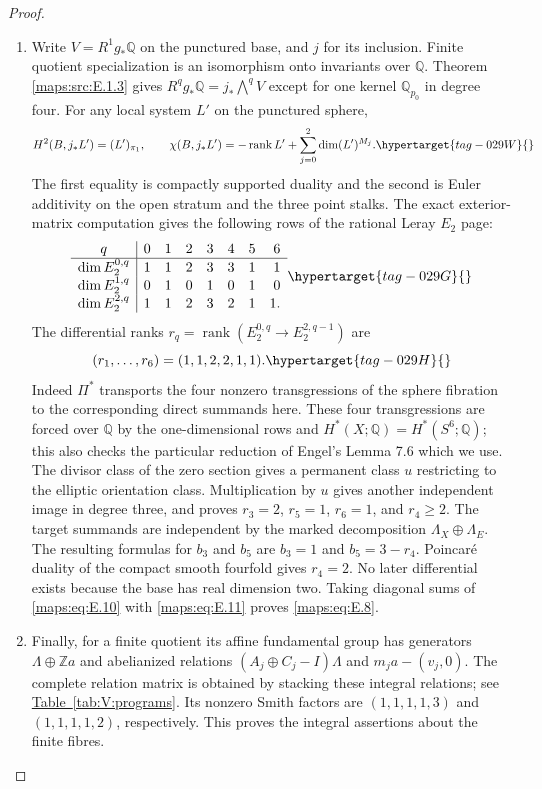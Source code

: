 \documentclass[11pt,a4paper]{article}
\numberwithin{equation}{section}
\theoremstyle{definition}
\begin{document}
\begin{proof}
\begin{enumerate}[label=\arabic*.,leftmargin=*]
\item Write $V=R^1g_*\mathbb Q$ on the punctured base, and $j$ for its
inclusion.  Finite quotient specialization is an isomorphism onto
invariants over $\mathbb Q$.  Theorem \ref{maps:src:E.1.3} gives
$R^qg_*\mathbb Q=j_*\bigwedge^qV$ except for one kernel
$\mathbb Q_{p_0}$ in degree four.  For any local system $L'$ on
the punctured sphere,
\begin{equation}
 H^2(B,j_*L')=(L')_{\pi_1},\qquad
 \chi(B,j_*L')=-\operatorname{rank}L'+
       \sum_{j=0}^2\dim (L')^{M_j}.
 \hypertarget{tag-029W}{}\label{maps:eq:E.9}
\end{equation}
The first equality is compactly supported duality and the second is
Euler additivity on the open stratum and the three point stalks.
The exact exterior-matrix computation gives the following rows of
the rational Leray $E_2$ page:
\begin{equation}
\begin{array}{c|rrrrrrr}
q&0&1&2&3&4&5&6\\ \hline
\dim E_2^{0,q}&1&1&2&3&3&1&1\\
\dim E_2^{1,q}&0&1&0&1&0&1&0\\
\dim E_2^{2,q}&1&1&2&3&2&1&1.
\end{array}
\hypertarget{tag-029G}{}\label{maps:eq:E.10}
\end{equation}
  The differential ranks
$r_q=\operatorname{rank}(E_2^{0,q}\to E_2^{2,q-1})$ are
\begin{equation}
 (r_1,\ldots,r_6)=(1,1,2,2,1,1).
 \hypertarget{tag-029H}{}\label{maps:eq:E.11}
\end{equation}
Indeed $\Pi^*$ transports the four nonzero transgressions of the
sphere fibration to the corresponding direct summands here.
These four transgressions are forced over $\mathbb Q$ by the
one-dimensional rows and $H^*(X;\mathbb Q)=H^*(S^6;\mathbb Q)$;
this also checks the particular reduction of Engel's Lemma 7.6
which we use.  The divisor class of the zero section gives a
permanent class $u$ restricting to the elliptic orientation class.
Multiplication by $u$ gives another independent image in degree
three, and proves $r_3=2$, $r_5=1$, $r_6=1$, and $r_4\geq2$.
The target summands are independent by the marked decomposition
$\Lambda_X\oplus\Lambda_E$.  The resulting formulas for $b_3$
and $b_5$ are $b_3=1$ and $b_5=3-r_4$.  Poincar\'e duality of
the compact smooth fourfold gives $r_4=2$.  No later differential
exists because the base has real dimension two.  Taking diagonal
sums of \eqref{maps:eq:E.10} with \eqref{maps:eq:E.11} proves \eqref{maps:eq:E.8}.

\item Finally, for a finite quotient its affine fundamental group has
generators $\Lambda\oplus\mathbb Z a$ and abelianized relations
$(A_j\oplus C_j-I)\Lambda$ and $m_ja-(v_j,0)$. The complete relation matrix is obtained by stacking these integral relations; see \hyperlink{prog:V:resolved}{Table~\ref*{tab:V:programs}}.
Its nonzero Smith factors are $(1,1,1,1,3)$ and
$(1,1,1,1,2)$, respectively.  This proves the integral assertions
about the finite fibres.
\end{enumerate}
\end{proof}
\end{document}
